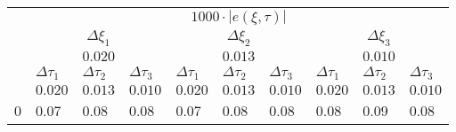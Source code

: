 \begin{tabular}{llllllllll}
\toprule
{} & \multicolumn{9}{c}{$1000\cdot|e(ξ,\tau)|$} \\
{} & \multicolumn{3}{c}{$\Delta ξ_1$} & \multicolumn{3}{c}{$\Delta ξ_2$} & \multicolumn{3}{c}{$\Delta ξ_3$} \\
{} & \multicolumn{3}{c}{$0.020$} & \multicolumn{3}{c}{$0.013$} & \multicolumn{3}{c}{$0.010$} \\
{} &        $\Delta \tau_1$ & $\Delta \tau_2$ & $\Delta \tau_3$ & $\Delta \tau_1$ & $\Delta \tau_2$ & $\Delta \tau_3$ & $\Delta \tau_1$ & $\Delta \tau_2$ & $\Delta \tau_3$ \\
{} &                $0.020$ &         $0.013$ &         $0.010$ &         $0.020$ &         $0.013$ &         $0.010$ &         $0.020$ &         $0.013$ &         $0.010$ \\
\midrule
0 &                   0.07 &            0.08 &            0.08 &            0.07 &            0.08 &            0.08 &            0.08 &            0.09 &            0.08 \\
\bottomrule
\end{tabular}
